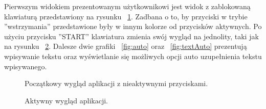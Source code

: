 \documentclass[twoside,a4paper]{book}
\begin{document}
Pierwszym widokiem prezentowanym użytkownikowi jest widok z zablokowaną klawiaturą przedstawiony na rysunku ~\ref{fig:inactive}.  Zadbana o to, by przyciski w trybie ''wstrzymania'' przedstawione były w innym kolorze od przycisków aktywnych. Po użyciu przycisku ''START'' klawiatura zmienia swój wygląd na jednolity, taki jak na rysunku ~\ref{fig:active}.
Dalesze dwie grafiki ~\ref{fig:auto} oraz ~\ref{fig:textAuto} prezentują wpisywanie tekstu oraz wyświetlanie się możliwych opcji auto uzupełnienia tekstu wpisywanego. 
\begin{figure}[h]
		\centering
		\caption{Początkowy wygląd aplikacji z nieaktywnymi przyciskami. }
		\label{fig:inactive}
\end{figure}
\begin{figure}
		\centering
		\caption{Aktywny wygląd aplikacji. }
		\label{fig:active}
\end{figure}
\end{document}
